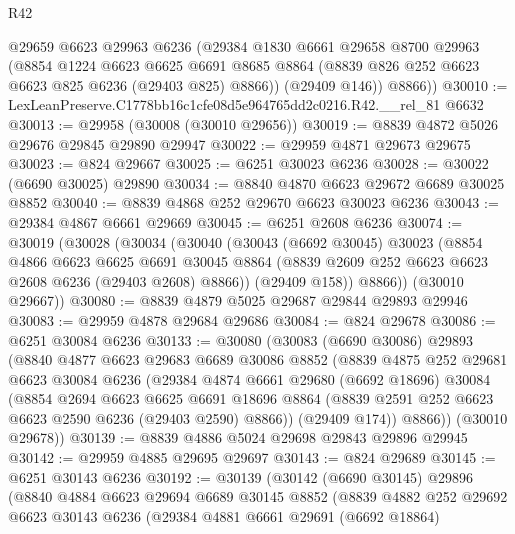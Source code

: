\begin{lexlean}{R42}
\begin{coremodule}
{        @29659
        @6623
        @29963
        @6236
        (@29384
          @1830
          @6661
          @29658
          @8700
          @29963
          (@8854
            @1224
            @6623
            @6625
            @6691
            @8685
            @8864
            (@8839 @826 @252 @6623 @6623 @825 @6236 (@29403 @825) @8866))
          (@29409 @146))
        @8866))
@30010 := LexLeanPreserve.C1778bb16c1cfe08d5e964765dd2c0216.R42.__rel_81 @6632
@30013 := @29958 (@30008 (@30010 @29656))
@30019 := @8839 @4872 @5026 @29676 @29845 @29890 @29947
@30022 := @29959 @4871 @29673 @29675
@30023 := @824 @29667
@30025 := @6251 @30023 @6236
@30028 := @30022 (@6690 @30025) @29890
@30034 := @8840 @4870 @6623 @29672 @6689 @30025 @8852
@30040 := @8839 @4868 @252 @29670 @6623 @30023 @6236
@30043 := @29384 @4867 @6661 @29669
@30045 := @6251 @2608 @6236
@30074 := @30019
    (@30028
      (@30034
        (@30040
          (@30043
            (@6692 @30045)
            @30023
            (@8854
              @4866
              @6623
              @6625
              @6691
              @30045
              @8864
              (@8839 @2609 @252 @6623 @6623 @2608 @6236 (@29403 @2608) @8866))
            (@29409 @158))
          @8866))
      (@30010 @29667))
@30080 := @8839 @4879 @5025 @29687 @29844 @29893 @29946
@30083 := @29959 @4878 @29684 @29686
@30084 := @824 @29678
@30086 := @6251 @30084 @6236
@30133 := @30080
    (@30083
      (@6690 @30086)
      @29893
      (@8840
        @4877
        @6623
        @29683
        @6689
        @30086
        @8852
        (@8839
          @4875
          @252
          @29681
          @6623
          @30084
          @6236
          (@29384
            @4874
            @6661
            @29680
            (@6692 @18696)
            @30084
            (@8854
              @2694
              @6623
              @6625
              @6691
              @18696
              @8864
              (@8839 @2591 @252 @6623 @6623 @2590 @6236 (@29403 @2590) @8866))
            (@29409 @174))
          @8866))
      (@30010 @29678))
@30139 := @8839 @4886 @5024 @29698 @29843 @29896 @29945
@30142 := @29959 @4885 @29695 @29697
@30143 := @824 @29689
@30145 := @6251 @30143 @6236
@30192 := @30139
    (@30142
      (@6690 @30145)
      @29896
      (@8840
        @4884
        @6623
        @29694
        @6689
        @30145
        @8852
        (@8839
          @4882
          @252
          @29692
          @6623
          @30143
          @6236
          (@29384
            @4881
            @6661
            @29691
            (@6692 @18864)
}
\end{coremodule}
\end{lexlean}
